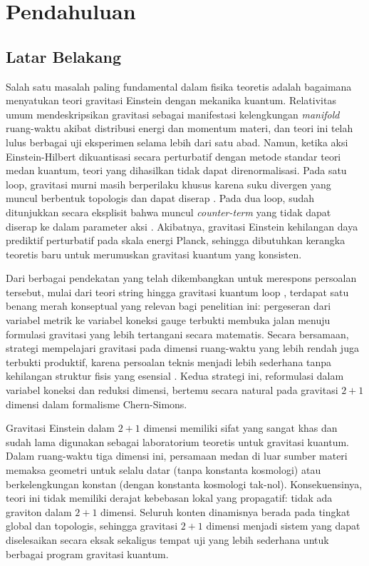 \chapter{Pendahuluan}

\section{Latar Belakang}

Salah satu masalah paling fundamental dalam fisika teoretis adalah bagaimana menyatukan teori gravitasi Einstein dengan mekanika kuantum. Relativitas umum mendeskripsikan gravitasi sebagai manifestasi kelengkungan \textit{manifold} ruang-waktu akibat distribusi energi dan momentum materi, dan teori ini telah lulus berbagai uji eksperimen selama lebih dari satu abad. Namun, ketika aksi Einstein-Hilbert dikuantisasi secara perturbatif dengan metode standar teori medan kuantum, teori yang dihasilkan tidak dapat direnormalisasi. Pada satu loop, gravitasi murni masih berperilaku khusus karena suku divergen yang muncul berbentuk topologis dan dapat diserap \cite{tHooft1974}. Pada dua loop, sudah ditunjukkan secara eksplisit bahwa muncul \textit{counter-term} yang tidak dapat diserap ke dalam parameter aksi \cite{goroff1986}. Akibatnya, gravitasi Einstein kehilangan daya prediktif perturbatif pada skala energi Planck, sehingga dibutuhkan kerangka teoretis baru untuk merumuskan gravitasi kuantum yang konsisten.

Dari berbagai pendekatan yang telah dikembangkan untuk merespons persoalan tersebut, mulai dari teori string \cite{greenschwarzwitten1987} hingga gravitasi kuantum loop \cite{rovellismolin1990, ashtekar1986new}, terdapat satu benang merah konseptual yang relevan bagi penelitian ini: pergeseran dari variabel metrik ke variabel koneksi gauge terbukti membuka jalan menuju formulasi gravitasi yang lebih tertangani secara matematis. Secara bersamaan, strategi mempelajari gravitasi pada dimensi ruang-waktu yang lebih rendah juga terbukti produktif, karena persoalan teknis menjadi lebih sederhana tanpa kehilangan struktur fisis yang esensial \cite{deser1984three, carlip1998quantum}. Kedua strategi ini, reformulasi dalam variabel koneksi dan reduksi dimensi, bertemu secara natural pada gravitasi $2+1$ dimensi dalam formalisme Chern-Simons.

Gravitasi Einstein dalam $2+1$ dimensi memiliki sifat yang sangat khas dan sudah lama digunakan sebagai laboratorium teoretis untuk gravitasi kuantum. Dalam ruang-waktu tiga dimensi ini, persamaan medan di luar sumber materi memaksa geometri untuk selalu datar (tanpa konstanta kosmologi) atau berkelengkungan konstan (dengan konstanta kosmologi tak-nol). Konsekuensinya, teori ini tidak memiliki derajat kebebasan lokal yang propagatif: tidak ada graviton dalam $2+1$ dimensi. Seluruh konten dinamisnya berada pada tingkat global dan topologis, sehingga gravitasi $2+1$ dimensi menjadi sistem yang dapat diselesaikan secara eksak sekaligus tempat uji yang lebih sederhana untuk berbagai program gravitasi kuantum.


